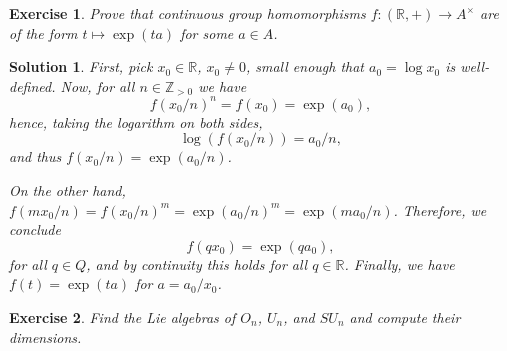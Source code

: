\documentclass{article}
\newtheorem{ex}{Exercise}
\theoremstyle{nonumberplain}
\newtheorem{sol}{Solution}
\newcommand{\R}{\mathbb{R}}
\newcommand{\Z}{\mathbb{Z}}
\begin{document}
\begin{ex}
Prove that continuous group homomorphisms $f \colon (\R, +) \to A^\times$ are of the form $t \mapsto \exp(t a)$ for some $a \in A$.
\end{ex}

\begin{sol}
First, pick $x_0 \in \R$, $x_0 \neq 0$, small enough that $a_0 = \log x_0$ is well-defined. Now, for all $n \in \Z_{> 0}$ we have
\begin{equation}
f(x_0/n)^n = f(x_0) = \exp(a_0),
\end{equation}
hence, taking the logarithm on both sides,
\begin{equation}
\log(f(x_0/n)) = a_0 / n,
\end{equation}
and thus $f(x_0/n) = \exp(a_0 / n)$.

On the other hand, $f(m x_0 / n) = f(x_0 / n)^m = \exp(a_0 / n)^m = \exp(m a_0 / n)$. Therefore, we conclude
\begin{equation}
f(q x_0) = \exp(q a_0),
\end{equation}
for all $q \in Q$, and by continuity this holds for all $q \in \R$. Finally, we have $f(t) = \exp(t a)$ for $a = a_0 / x_0$.
\end{sol}

\begin{ex}
Find the Lie algebras of $O_n$, $U_n$, and $SU_n$ and compute their dimensions.
\end{ex}
\end{document}
